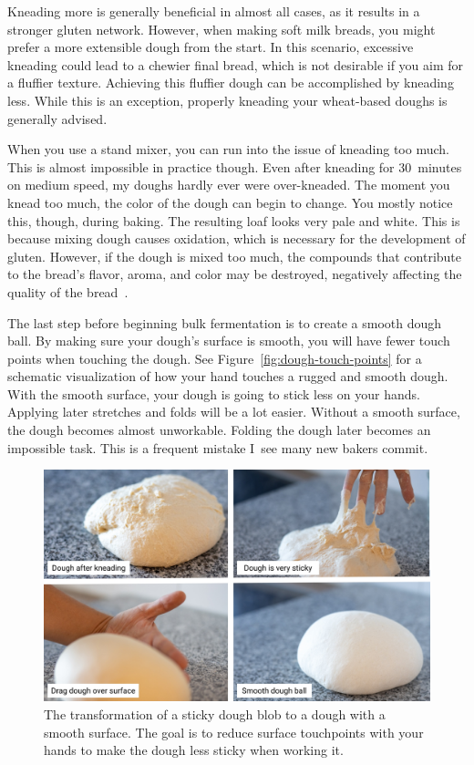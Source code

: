 Kneading more is generally beneficial in almost all cases, as it results in a
stronger gluten network. However, when making soft milk breads, you might prefer
a more extensible dough from the start. In this scenario, excessive kneading
could lead to a chewier final bread, which is not desirable if you aim for a
fluffier texture. Achieving this fluffier dough can be accomplished by kneading
less. While this is an exception, properly kneading your wheat-based doughs
is generally advised.

When you use a stand mixer, you can run into the issue of kneading too much. This
is almost impossible in practice though. Even after kneading for 30~minutes on medium
speed, my doughs hardly ever were over-kneaded. The moment you knead
too much, the color of the dough can begin to change. You mostly
notice this, though, during baking. The resulting loaf looks very
pale and white. This is because mixing dough causes oxidation,
which is necessary for the development of gluten.
However, if the dough is mixed too much, the compounds that contribute
to the bread's flavor, aroma, and color may be destroyed, negatively
affecting the quality of the bread~\cite{oxidization+dough}.

The last step before beginning bulk fermentation is to
create a smooth dough ball. By making sure your dough's surface is
smooth, you will have fewer touch points when touching the dough.
See Figure~\ref{fig:dough-touch-points} for a schematic visualization
of how your hand touches a rugged and smooth dough.
With the smooth surface, your dough is going to stick less on your hands. Applying
later stretches and folds will be a lot easier. Without a smooth
surface, the dough becomes almost unworkable. Folding the dough later
becomes an impossible task. This is a frequent mistake I~see many
new bakers commit.

\begin{figure}[!htb]
  \includegraphics[width=\textwidth]{dough-ball-steps}
  \caption[Creating a smooth surface]{The transformation of a sticky dough
      blob to a dough with a smooth surface. The goal is to reduce surface
      touchpoints with your hands to make the dough less sticky when working
      it.}%
  \label{fig:dough-ball-steps}
\end{figure}

